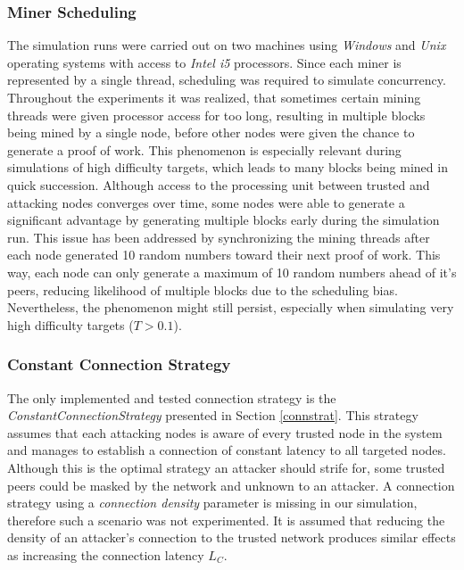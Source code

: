 \documentclass[a4paper,12pt,twoside]{report}
\begin{document}
\subsubsection{Miner Scheduling}
The simulation runs were carried out on two machines using \textit{Windows} and \textit{Unix} operating systems with access to \textit{Intel i5} processors. Since each miner is represented by a single thread, scheduling was required to simulate concurrency. Throughout the experiments it was realized, that sometimes certain mining threads were given processor access for too long, resulting in multiple blocks being mined by a single node, before other nodes were given the chance to generate a proof of work. This phenomenon is especially relevant during simulations of high difficulty targets, which leads to many blocks being mined in quick succession. Although access to the processing unit between trusted and attacking nodes converges over time, some nodes were able to generate a significant advantage by generating multiple blocks early during the simulation run. This issue has been addressed by synchronizing the mining threads after each node generated 10 random numbers toward their next proof of work. This way, each node can only generate a maximum of 10 random numbers ahead of it's peers, reducing likelihood of multiple blocks due to the scheduling bias. Nevertheless, the phenomenon might still persist, especially when simulating very high difficulty targets ($T > 0.1$).
\subsubsection{Constant Connection Strategy}
The only implemented and tested connection strategy is the \textit{ConstantConnectionStrategy} presented in Section \ref{connstrat}. This strategy assumes that each attacking nodes is aware of every trusted node in the system and manages to establish a connection of constant latency to all targeted nodes. Although this is the optimal strategy an attacker should strife for, some trusted peers could be masked by the network and unknown to an attacker. A connection strategy using a \textit{connection density} parameter is missing in our simulation, therefore such a scenario was not experimented. It is assumed that reducing the density of an attacker's connection to the trusted network produces similar effects as increasing the connection latency $L_C$.
\end{document}
